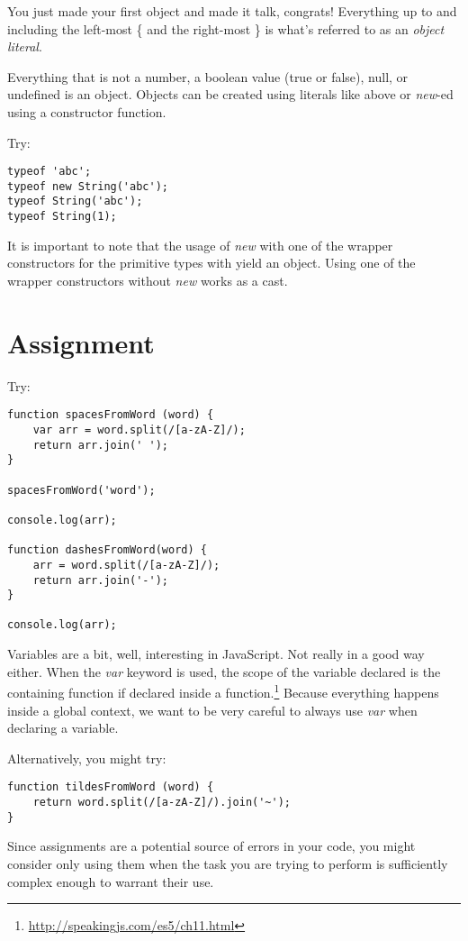 \documentclass{article}
\begin{document}
You just made your first object and made it talk, congrats! Everything up to and including the left-most \{ and the right-most \} is what’s referred to as an \emph{object literal}.

Everything that is not a number, a boolean value (true or false), null, or undefined is an object. Objects can be created using literals like above or \emph{new}-ed using a constructor function.

Try:
\begin{lstlisting}
typeof 'abc';
typeof new String('abc');
typeof String('abc');
typeof String(1);
\end{lstlisting}

It is important to note that the usage of \emph{new} with one of the wrapper constructors for the primitive types with yield an object. Using one of the wrapper constructors without \emph{new} works as a cast.

\section{Assignment}
Try:
\begin{lstlisting}
function spacesFromWord (word) {
    var arr = word.split(/[a-zA-Z]/);
    return arr.join(' ');
}

spacesFromWord('word');

console.log(arr);

function dashesFromWord(word) {
    arr = word.split(/[a-zA-Z]/);
    return arr.join('-');
}

console.log(arr);
\end{lstlisting}

Variables are a bit, well, interesting in JavaScript. Not really in a good way either.
When the \emph{var} keyword is used, the scope of the variable declared is the containing function if declared inside a function.\footnote{\url{http://speakingjs.com/es5/ch11.html}} Because everything happens inside a global context, we want to be very careful to always use \emph{var} when declaring a variable.

Alternatively, you might try:
\begin{lstlisting}
function tildesFromWord (word) {
    return word.split(/[a-zA-Z]/).join('~');
}
\end{lstlisting}
Since assignments are a potential source of errors in your code, you might consider only using them when the task you are trying to perform is sufficiently complex enough to warrant their use.
\end{document}
